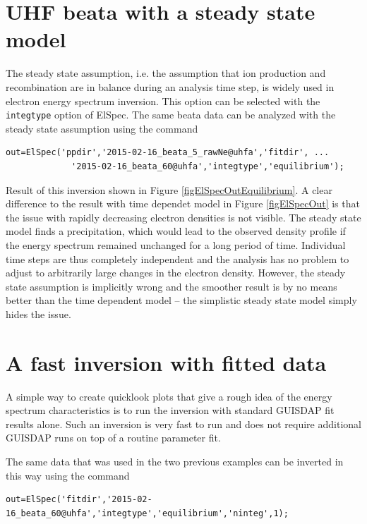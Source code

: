 \documentclass[12pt,a4paper]{report}
\begin{document}
\section{UHF beata with a steady state model}

The steady state assumption, i.e. the assumption that ion production and recombination are in balance during an analysis time step, is widely used in electron energy spectrum inversion. This option can be selected with the \verb|integtype| option of ElSpec. The same beata data can be analyzed with the steady state assumption using the command
\begin{lstlisting}[style=myMATLAB]
out=ElSpec('ppdir','2015-02-16_beata_5_rawNe@uhfa','fitdir', ...
             '2015-02-16_beata_60@uhfa','integtype','equilibrium');
\end{lstlisting}

Result of this inversion shown in Figure \ref{figElSpecOutEquilibrium}. A clear difference to the result with time dependet model in Figure \ref{figElSpecOut} is that the issue with rapidly decreasing electron densities is not visible. The steady state model finds a precipitation, which would lead to the observed density profile if the energy spectrum remained unchanged for a long period of time. Individual time steps are thus completely independent and the analysis has no problem to adjust to arbitrarily large changes in the electron density. However, the steady state assumption is implicitly wrong and the smoother result is by no means better than the time dependent model -- the simplistic steady state model simply hides the issue.

\section{A fast inversion with fitted data}

A simple way to create quicklook plots that give a rough idea of the energy spectrum characteristics is to run the inversion with standard GUISDAP fit results alone. Such an inversion is very fast to run and does not require additional GUISDAP runs on top of a routine parameter fit. 

The same data that was used in the two previous examples can be inverted in this way using the command
\begin{lstlisting}[style=myMATLAB]
out=ElSpec('fitdir','2015-02-16_beata_60@uhfa','integtype','equilibrium','ninteg',1);
\end{lstlisting}
\end{document}
